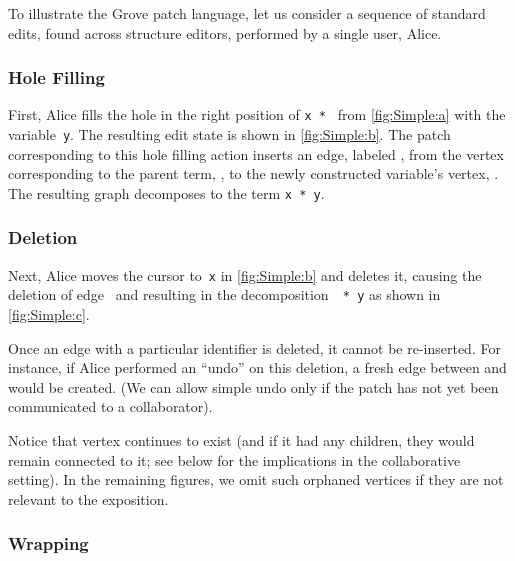 To illustrate the Grove patch language, let us consider a sequence of standard edits, found across structure editors, performed by a single user, Alice.

\subsubsection{Hole Filling}%
\label{sub:Construction}

First, Alice fills the hole in the right position of \texttt{x * \hole} from \autoref{fig:Simple:a} with the variable~\texttt{y}. The resulting edit state is shown in \autoref{fig:Simple:b}.
The patch corresponding to this hole filling action inserts an edge, labeled \eSimpleY{}, from the vertex corresponding to the parent term, \vSimpleTimes{}, to the newly constructed variable's vertex, \vSimpleY{}. 
The resulting graph decomposes to the term \texttt{x * y}.

\subsubsection{Deletion}%
\label{sub:Deletion}


Next, Alice moves the cursor to~\texttt{x} in \autoref{fig:Simple:b} and deletes it, 
causing the deletion of edge~\eSimpleX{} and  resulting in the decomposition~\texttt{\hole{} * y} as shown in \autoref{fig:Simple:c}.

Once an edge with a particular identifier is deleted, it cannot be re-inserted.
For instance, if Alice performed an ``undo'' on this deletion,
a fresh edge between \vSimpleTimes{} and \vSimpleX{} would be created. (We can allow simple undo only if the patch has not yet been communicated to a collaborator). 

Notice that vertex \vSimpleX{} continues to exist (and if it had any children, they would remain connected to it; see below for the implications in the collaborative setting). In the remaining figures, we omit such orphaned vertices if they are not relevant to the exposition.


\subsubsection{Wrapping}%
\label{sub:Wrapping}

